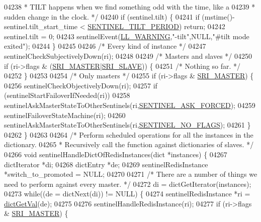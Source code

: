 \begin{DoxyCode}
{{{{{{{{{{{{{{{{{{{{{{{{{{{{{{{{{{{{{{{{{{{{{{{{{{{{{{{{{{{{{{{{{{{{{{{{{{{{{{{{{{{{{{{{{{{{{{{{{{{{{{04238 \textcolor{comment}{     * TILT happens when we find something odd with the time, like a}
04239 \textcolor{comment}{     * sudden change in the clock. */}
04240     \textcolor{keywordflow}{if} (sentinel.tilt) \{
04241         \textcolor{keywordflow}{if} (mstime()-sentinel.tilt\_start\_time < \hyperlink{sentinel_8c_af2d8538f1bdf8d6e616675b143d54685}{SENTINEL\_TILT\_PERIOD}) \textcolor{keywordflow}{return};
04242         sentinel.tilt = 0;
04243         sentinelEvent(\hyperlink{server_8h_a31229b9334bba7d6be2a72970967a14b}{LL\_WARNING},\textcolor{stringliteral}{"-tilt"},NULL,\textcolor{stringliteral}{"#tilt mode exited"});
04244     \}
04245 
04246     \textcolor{comment}{/* Every kind of instance */}
04247     sentinelCheckSubjectivelyDown(ri);
04248 
04249     \textcolor{comment}{/* Masters and slaves */}
04250     \textcolor{keywordflow}{if} (ri->flags & (\hyperlink{sentinel_8c_a2ee83e5ff67b45746cd6a310f15334b2}{SRI\_MASTER}|\hyperlink{sentinel_8c_a4b9db21eda79d49bd9fdf2cf7b3178e8}{SRI\_SLAVE})) \{
04251         \textcolor{comment}{/* Nothing so far. */}
04252     \}
04253 
04254     \textcolor{comment}{/* Only masters */}
04255     \textcolor{keywordflow}{if} (ri->flags & \hyperlink{sentinel_8c_a2ee83e5ff67b45746cd6a310f15334b2}{SRI\_MASTER}) \{
04256         sentinelCheckObjectivelyDown(ri);
04257         \textcolor{keywordflow}{if} (sentinelStartFailoverIfNeeded(ri))
04258             sentinelAskMasterStateToOtherSentinels(ri,\hyperlink{sentinel_8c_a166080e23b7691124260c5ea1b053380}{SENTINEL\_ASK\_FORCED});
04259         sentinelFailoverStateMachine(ri);
04260         sentinelAskMasterStateToOtherSentinels(ri,\hyperlink{sentinel_8c_a4d5f3da6bf36b5daaa353968a5e133a3}{SENTINEL\_NO\_FLAGS});
04261     \}
04262 \}
04263 
04264 \textcolor{comment}{/* Perform scheduled operations for all the instances in the dictionary.}
04265 \textcolor{comment}{ * Recursively call the function against dictionaries of slaves. */}
04266 \textcolor{keywordtype}{void} sentinelHandleDictOfRedisInstances(dict *instances) \{
04267     dictIterator *di;
04268     dictEntry *de;
04269     sentinelRedisInstance *switch\_to\_promoted = NULL;
04270 
04271     \textcolor{comment}{/* There are a number of things we need to perform against every master. */}
04272     di = dictGetIterator(instances);
04273     \textcolor{keywordflow}{while}((de = dictNext(di)) != NULL) \{
04274         sentinelRedisInstance *ri = \hyperlink{dict_8h_ae8d2cc391873b2bea2b87c4f80f43120}{dictGetVal}(de);
04275 
04276         sentinelHandleRedisInstance(ri);
04277         \textcolor{keywordflow}{if} (ri->flags & \hyperlink{sentinel_8c_a2ee83e5ff67b45746cd6a310f15334b2}{SRI\_MASTER}) \{
}}}}}}}}}}}}}}}}}}}}}}}}}}}}}}}}}}}}}}}}}}}}}}}}}}}}}}}}}}}}}}}}}}}}}}}}}}}}}}}}}}}}}}}}}}}}}}}}}}}}}}
\end{DoxyCode}

